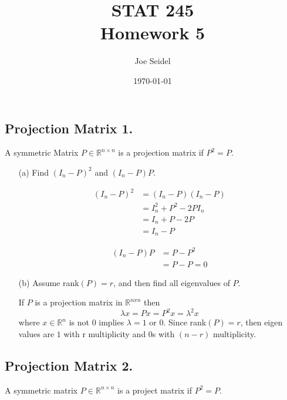 \documentclass{tufte-book}
\title{STAT  245\\Homework 5}
\author{Joe Seidel}
\date{\today}
\begin{document}
\maketitle
{}
\newpage
{}

\subsection{Projection Matrix 1.}
A symmetric Matrix $P \in \mathbb{R}^{n \times n}$ is a projection matrix if $P^2=P$.

\begin{enumerate}

\item[(a)] Find $(I_n - P)^2$ and $(I_n - P)P$.

\begin{align*}
(I_n - P)^2 &= (I_n - P)(I_n - P)\\
&= I_n^2 + P^2 - 2PI_n\\
&= I_n + P - 2P\\
&= I_n - P
\end{align*}

\begin{align*}
(I_n-P)P &= P - P^2\\
&= P-P=0
\end{align*}

\item[(b)] Assume rank$(P)=r$, and then find all eigenvalues of $P$.

If $P$ is a projection matrix in $\mathbb{R}^{nxn}$ then
\[ \lambda x = Px = P^2 x = \lambda^2 x \]
where $x \in \mathbb{R}^n$ is not $0$ implies $\lambda = 1$ or $0$.  Since rank$(P)=r$, then eigen values are $1$ with r multiplicity and $0$s with $(n-r)$ multiplicity.

\end{enumerate}

\subsection{Projection Matrix 2.} A symmetric matrix $P\in \mathbb{R}^{n \times n}$ is a project matrix if $P^2=P$.
\end{document}
